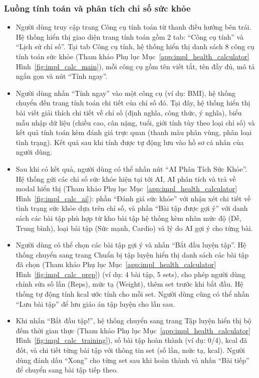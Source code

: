 \subsubsection{Luồng tính toán và phân tích chỉ số sức khỏe}

\begin{itemize}
    \item Người dùng truy cập trang Công cụ tính toán từ thanh điều hướng bên trái. Hệ thống hiển thị giao diện trang tính toán gồm 2 tab: ``Công cụ tính'' và ``Lịch sử chỉ số''. Tại tab Công cụ tính, hệ thống hiển thị danh sách 8 công cụ tính toán sức khỏe (Tham khảo Phụ lục Mục~\ref{app:impl_health_calculator} Hình~\ref{fig:impl_calc_main}), mỗi công cụ gồm tên viết tắt, tên đầy đủ, mô tả ngắn gọn và nút ``Tính ngay''.


    \item Người dùng nhấn ``Tính ngay'' vào một công cụ (ví dụ: BMI), hệ thống chuyển đến trang tính toán chi tiết của chỉ số đó. Tại đây, hệ thống hiển thị bài viết giải thích chi tiết về chỉ số (định nghĩa, công thức, ý nghĩa), biểu mẫu nhập dữ liệu (chiều cao, cân nặng, tuổi, giới tính tùy theo loại chỉ số) và kết quả tính toán kèm đánh giá trực quan (thanh màu phân vùng, phân loại tình trạng). Kết quả sau khi tính được tự động lưu vào hồ sơ cá nhân của người dùng.

    \item Sau khi có kết quả, người dùng có thể nhấn nút ``AI Phân Tích Sức Khỏe''. Hệ thống gửi các chỉ số sức khỏe hiện tại tới AI, AI phân tích và trả về modal hiển thị (Tham khảo Phụ lục Mục~\ref{app:impl_health_calculator} Hình~\ref{fig:impl_calc_ai}): phần ``Đánh giá sức khỏe'' với nhận xét chi tiết về tình trạng sức khỏe dựa trên chỉ số, và phần ``Bài tập được gợi ý'' với danh sách các bài tập phù hợp từ kho bài tập hệ thống kèm nhãn mức độ (Dễ, Trung bình), loại bài tập (Sức mạnh, Cardio) và lý do AI gợi ý cho từng bài.


    \item Người dùng có thể chọn các bài tập gợi ý và nhấn ``Bắt đầu luyện tập''. Hệ thống chuyển sang trang Chuẩn bị tập luyện hiển thị danh sách các bài tập đã chọn (Tham khảo Phụ lục Mục~\ref{app:impl_health_calculator} Hình~\ref{fig:impl_calc_prep}) (ví dụ: 4 bài tập, 5 sets), cho phép người dùng chỉnh sửa số lần (Reps), mức tạ (Weight), thêm set trước khi bắt đầu. Hệ thống tự động tính kcal ước tính cho mỗi set. Người dùng cũng có thể nhấn ``Lưu bài tập'' để lưu giáo án tập luyện cho lần sau.


    \item Khi nhấn ``Bắt đầu tập!'', hệ thống chuyển sang trang Tập luyện hiển thị bộ đếm thời gian thực (Tham khảo Phụ lục Mục~\ref{app:impl_health_calculator} Hình~\ref{fig:impl_calc_training}), số bài tập hoàn thành (ví dụ: 0/4), kcal đã đốt, và chi tiết từng bài tập với thông tin set (số lần, mức tạ, kcal). Người dùng đánh dấu ``Xong'' cho từng set sau khi hoàn thành và nhấn ``Bài tiếp'' để chuyển sang bài tập tiếp theo.



\end{itemize}
